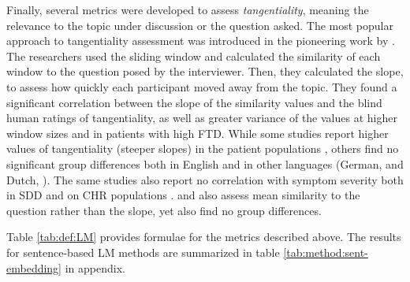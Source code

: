 Finally, several metrics were developed to assess \textit{tangentiality}, meaning the relevance to the topic under discussion or the question asked. The most popular approach to tangentiality assessment was introduced in the pioneering work by \cite{elvevaag2007quantifying}. The researchers used the sliding window and calculated the similarity of each window to the question posed by the interviewer. Then, they calculated the slope, to assess how quickly each participant moved away from the topic. They found a significant correlation between the slope of the similarity values and the blind human ratings of tangentiality, as well as greater variance of the values at higher window sizes and in patients with high FTD.  While some studies report higher values of tangentiality (steeper slopes) in the patient populations \citep{iter2018automatic, tang2021natural}, others find no significant group differences both in English \citep{hitczenko2021understanding, morgan2021natural} and in other languages (German, \cite{koranova2017analyzing, just2019coherence} and Dutch, \cite{dore2019quantification}). The same studies also report no correlation with symptom severity both in SDD \citep{dore2019quantification} and on CHR populations \citep{hitczenko2021understanding, morgan2021natural}. \citet{koranova2017analyzing} and \citet{just2019coherence} also assess mean similarity to the question rather than the slope, yet also find no group differences.

Table \ref{tab:def:LM} provides formulae for the metrics described above. The results for sentence-based LM methods are summarized in table \ref{tab:method:sent-embedding} in appendix.

